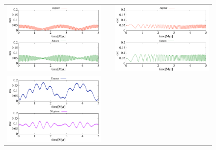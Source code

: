 \documentclass[11pt,a4paper,oneside,onecolumn]{jarticle}
\begin{document}
\begin{figure}[H]
\begin{tabular}{ccc}
\begin{minipage}[t]{0.45\hsize}
\centering
\includegraphics[width=8cm]{./image/NoMove_ecc_5Myr_JUPSAT.pdf}
\end{minipage} &
\begin{minipage}[t]{0.1\hsize}
\end{minipage} &
\begin{minipage}[t]{0.45\hsize}
\centering
\includegraphics[width=8cm]{./image/Move500kyr_ecc_5Myr_JUPSAT.pdf}
\end{minipage}\\
\begin{minipage}[t]{0.45\hsize}
\centering
\includegraphics[width=8cm]{./image/NoMove_ecc_5Myr_URANEP.pdf}
\end{minipage} &

\end{tabular}
\end{figure}
\end{document}
